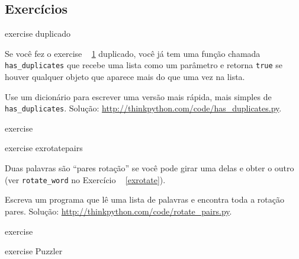 \documentclass[10pt]{book}
\begin{document}
\begin{exercise}
\begin{v erbatim}

\section{Exercícios}

\begin{} exercise
\index{} duplicado

Se você fez o exercise ~ \ref {} duplicado, você já tem
uma função chamada \verb "has_duplicates" que recebe uma lista
como um parâmetro e retorna {\tt true} se houver qualquer objeto
que aparece mais do que uma vez na lista.

Use um dicionário para escrever uma versão mais rápida, mais simples de
\verb "has_duplicates". 
Solução: \url{http://thinkpython.com/code/has_duplicates.py}.

\end{} exercise


\begin{} exercise
\label{} exrotatepairs

Duas palavras são ``pares rotação'' se você pode girar uma delas
e obter o outro (ver \verb "rotate_word" no Exercício ~ \ref {exrotate}).

Escreva um programa que lê uma lista de palavras e encontra toda a rotação
pares. Solução: \url{http://thinkpython.com/code/rotate_pairs.py}.

\end{} exercise


\begin{} exercise
\index{} Puzzler


\end{}
\end{v erbatim}
\end{exercise}
\end{document}
